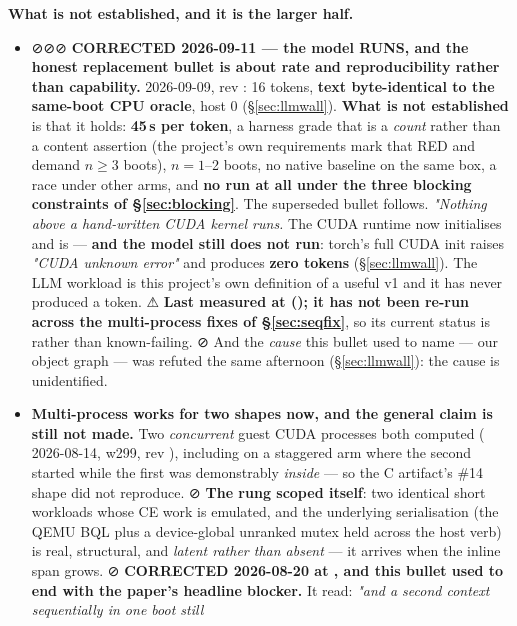 \documentclass[10.5pt]{article}
\begin{document}
\begin{warnbox}
\smallskip
\textbf{What is not established, and it is the larger half.}
\begin{itemize}\small
\item ⊘⊘⊘ \textbf{CORRECTED 2026-09-11 --- the model RUNS, and the honest replacement bullet is
  about rate and reproducibility rather than capability.} \measured{} 2026-09-09, rev
  : 16 tokens, \textbf{text byte-identical to the same-boot CPU oracle}, host
   0 (\S\ref{sec:llmwall}). \textbf{What is not established} is that it holds:
  \textbf{45\,s per token}, a harness grade that is a \emph{count} rather than a content
  assertion (the project's own requirements mark that RED and demand $n \geq 3$ boots), $n = 1$--2
  boots, no native baseline on the same box, a \measured{} race under other arms, and \textbf{no
  run at all under the three blocking constraints of \S\ref{sec:blocking}}. The superseded bullet
  follows. \emph{"Nothing above a hand-written CUDA kernel runs.} The CUDA runtime now initialises
  and  is  — \textbf{and the model still does not
  run}: torch's full CUDA init raises \emph{"CUDA unknown error"} and produces \textbf{zero
  tokens} (\S\ref{sec:llmwall}). The LLM workload is this project's own definition of a useful
  v1 and it has never produced a token. ⚠ \textbf{Last measured at 
  (); it has not been re-run across the multi-process fixes of
  \S\ref{sec:seqfix}}, so its current status is \unver{} rather than known-failing. ⊘ And the
  \emph{cause} this bullet used to name — our object graph — was refuted the same afternoon
  (\S\ref{sec:llmwall}): the cause is unidentified.
\item \textbf{Multi-process works for two shapes now, and the general claim is still not made.}
  Two \emph{concurrent} guest CUDA processes both computed  (\measured{} 2026-08-14,
  w299, rev ), including on a staggered arm where the second started while the
  first was demonstrably \emph{inside}  — so the C artifact's \#14 shape did
  not reproduce. ⊘ \textbf{The rung scoped itself}: two identical short workloads whose CE work is
  emulated, and the underlying serialisation (the QEMU BQL plus a device-global unranked mutex
  held across the host verb) is real, structural, and \emph{latent rather than absent} — it
  arrives when the inline span grows.
  \newline ⊘ \textbf{CORRECTED 2026-08-20 at , and this bullet used to end with the
  paper's headline blocker.} It read: \emph{"and a second context sequentially in one boot still
}
\end{itemize}
\end{warnbox}
\end{document}

